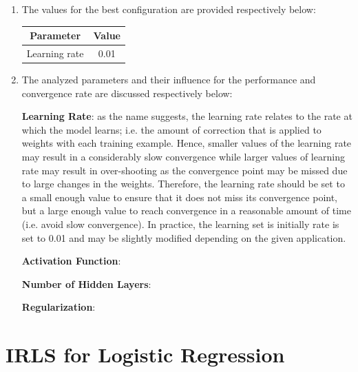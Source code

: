 \documentclass[12pt,a4paper]{article}
\begin{document}
	\begin{enumerate}
		\item The values for the best configuration are provided respectively below:
		\begin{center}
			
			\begin{tabular}{|c|c|}
				\hline
				Parameter& Value \\ \hline
				Learning rate& 0.01 \\ \hline
			\end{tabular}
		\end{center}
	
		\item The analyzed parameters and their influence for the performance and convergence rate are discussed respectively below:
		
		\noindent \textbf{\small Learning Rate}: as the name suggests, the learning rate relates to the rate at which the model learns; i.e. the amount of correction that is applied to weights with each training example. Hence, smaller values of the learning rate may result in a considerably slow convergence while larger values of learning rate may result in over-shooting as the convergence point may be missed due to large changes in the weights. Therefore, the learning rate should be set to a small enough value to ensure that it does not miss its convergence point, but a large enough value to reach convergence in a reasonable amount of time (i.e. avoid slow convergence). In practice, the learning set is initially rate is set to 0.01 and may be slightly modified depending on the given application.
		
		\noindent \textbf{\small Activation Function}: 
		
		\noindent \textbf{\small Number of Hidden Layers}:
		
		\noindent \textbf{\small Regularization}: 
		
	\end{enumerate}
	
	
	\section{IRLS for Logistic Regression}
	
	
	
\end{document}
